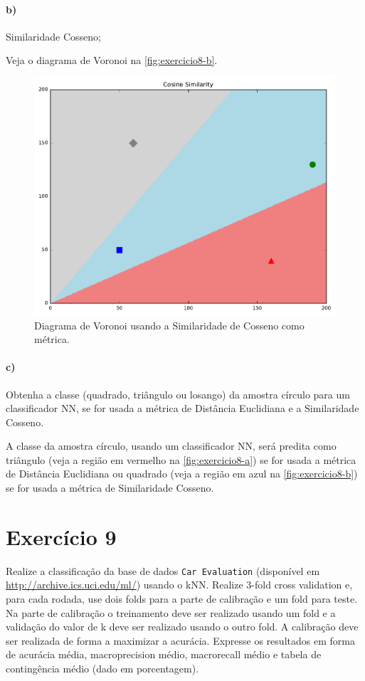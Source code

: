 \documentclass{article}
\begin{document}
\paragraph{b)} Similaridade Cosseno;

Veja o diagrama de Voronoi na \autoref{fig:exercicio8-b}.

\begin{figure}[h]
	\centering
	\includegraphics[width=0.5\linewidth]{exercicio8-b.pdf}
	\caption{Diagrama de Voronoi usando a Similaridade de Cosseno como métrica.}
	\label{fig:exercicio8-b}
\end{figure}

\paragraph{c)} Obtenha a classe (quadrado, triângulo ou losango) da amostra círculo para um
classificador NN, se for usada a métrica de Distância Euclidiana e a Similaridade Cosseno.

A classe da amostra círculo, usando um classificador NN, será predita como triângulo (veja a região em vermelho na \autoref{fig:exercicio8-a}) se for usada a métrica de Distância Euclidiana ou quadrado (veja a região em azul na \autoref{fig:exercicio8-b}) se for usada a métrica de Similaridade Cosseno.

\section{Exercício 9}

Realize a classificação da base de dados \texttt{Car Evaluation} (disponível em \url{http://archive.ics.uci.edu/ml/}) usando o kNN. Realize 3-fold cross validation e, para cada rodada, use dois folds para a parte de calibração e um fold para teste. Na parte de calibração o treinamento deve ser realizado usando um fold e a validação do valor de k deve ser realizado usando o outro fold. A calibração deve ser realizada de forma a maximizar a acurácia. Expresse os resultados em forma de acurácia média, macroprecision médio, macrorecall médio e tabela de contingência médio (dado em porcentagem).
\end{document}
